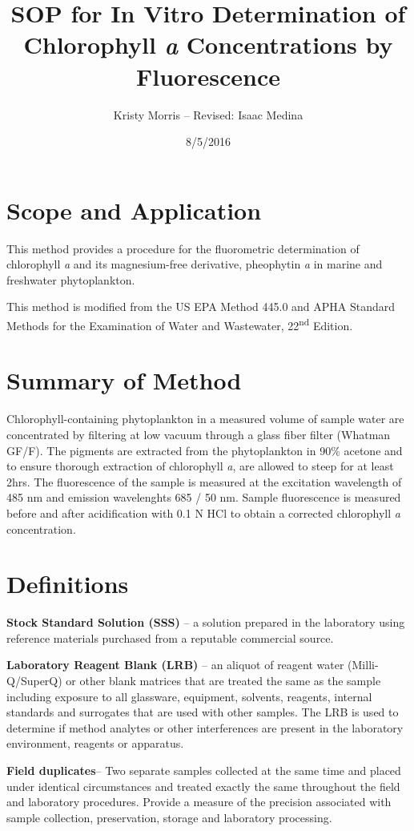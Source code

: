 \documentclass[12pt]{../SOP3}\usepackage[]{graphicx}\usepackage[]{color}
\author{Kristy Morris -- Revised: Isaac Medina}
\title{SOP for In Vitro Determination of Chlorophyll \textit{a} Concentrations by Fluorescence}
\date{8/5/2016}
\begin{document}
\maketitle

 \section{Scope and Application}

\NP This method provides a procedure for the fluorometric determination of chlorophyll \textit{a} and its magnesium-free derivative, pheophytin \textit{a} in marine and freshwater phytoplankton.

\NP This method is modified from the US EPA Method 445.0 and APHA Standard Methods for the Examination of Water and Wastewater, 22\textsuperscript{nd} Edition. 

\section{Summary of Method}

\NP Chlorophyll-containing phytoplankton in a measured volume of sample water are concentrated by filtering at low vacuum through a glass fiber filter (Whatman GF/F). The pigments are extracted from the phytoplankton in 90\% acetone and to ensure thorough extraction of chlorophyll \textit{a}, are allowed to steep for at least 2hrs. The fluorescence of the sample is measured at the excitation wavelength of 485 nm and emission wavelenghts 685 / 50 nm. Sample fluorescence is measured before and after acidification with 0.1 N HCl to obtain a corrected chlorophyll \textit{a} concentration. 


\section{Definitions}
\NP \textbf{Stock Standard Solution (SSS)} -- a solution prepared in the laboratory using reference materials purchased from a reputable commercial source.

\NP \textbf{Laboratory Reagent Blank (LRB)} -- an aliquot of reagent water (Milli-Q/SuperQ) or other blank matrices that are treated the same as the sample including exposure to all glassware, equipment, solvents, reagents, internal standards and surrogates that are used with other samples. The LRB is used to determine if method analytes or other interferences are present in the laboratory environment, reagents or apparatus. 

\NP \textbf{Field duplicates}-- Two separate samples collected at the same time and placed under identical circumstances and treated exactly the same throughout the field and laboratory procedures. Provide a measure of the precision associated with sample collection, preservation, storage and laboratory processing. 
\end{document}
